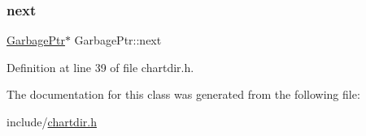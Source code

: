 \subsubsection{\texorpdfstring{next}{next}}
{\footnotesize\ttfamily \hyperlink{class_garbage_ptr}{Garbage\+Ptr}$\ast$ Garbage\+Ptr\+::next}



Definition at line 39 of file chartdir.\+h.



The documentation for this class was generated from the following file\+:\begin{DoxyCompactItemize}
\item 
include/\hyperlink{chartdir_8h}{chartdir.\+h}\end{DoxyCompactItemize}
